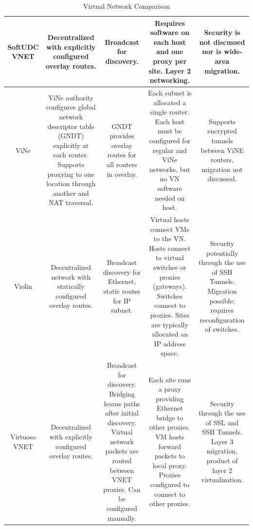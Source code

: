 \begin{table}[ht]
\begin{tabular*}{0.75\textwidth}{|c||c|c|c|c|}
SoftUDC VNET
&
Decentralized with explicitly configured overlay routes.
&
Broadcast for discovery.
&
Requires software on each host and one proxy per site.  Layer 2 networking.
&
Security is not discussed nor is wide-area migration.
\\ \hline
ViNe
&
ViNe authority configures global network descriptor table (GNDT) explicitly at
each router. Supports proxying to one location through another and NAT traversal.
&
GNDT provides overlay routes for all routers in overlay.
&
Each subnet is allocated a single router.  Each host must be configured for
regular and ViNe networks, but no VN software needed on host.
&
Supports encrypted tunnels between ViNE routers, migration not discussed.
\\ \hline
Violin
&
Decentralized network with statically configured overlay routes.
&
Broadcast discovery for Ethernet, static routes for IP subnet.
&
Virtual hosts connect VMs to the VN.  Hosts connect to virtual switches or
proxies (gateways).  Switches connect to proxies.  Sites are typically
allocated an IP address space.
&
Security potentially through the use of SSH Tunnels.  Migration possible;
requires reconfiguration of switches. 
\\ \hline
Virtuoso VNET
&
Decentralized with explicitly configured overlay routes.
&
Broadcast for discovery.  Bridging learns paths after initial discovery.  Virtual
network packets are routed between VNET proxies.  Can be configured manually.
&
Each site runs a proxy providing Ethernet bridge to other proxies.  VM hosts
forward packets to local proxy.  Proxies configured to connect to other proxies.
&
Security through the use of SSL and SSH Tunnels.  Layer 3 migration, product of
layer 2 virtualization.
\\ \hline
\end{tabular*}
\caption{Virtual Network Comparison}
\label{tab:virtual_networks}
\end{table}

